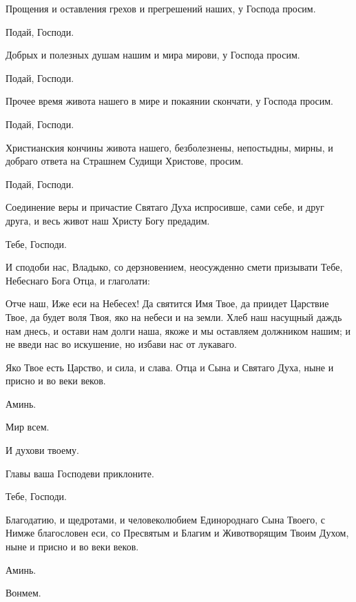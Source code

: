 \begin{mymulticols}
 Прощения и оставления грехов и прегрешений наших, у Господа просим. 

 Подай, Господи.

 Добрых и полезных душам нашим и мира мирови, у Господа просим. 

 Подай, Господи.

 Прочее время живота нашего в мире и покаянии скончати, у Господа просим. 

 Подай, Господи.

 Христианския кончины живота нашего, безболезнены, непостыдны, мирны, и добраго ответа на Страшнем Судищи Христове, просим. 

 Подай, Господи.

 Соединение веры и причастие Святаго Духа испросивше, сами себе, и друг друга, и весь живот наш Христу Богу предадим. 

 Тебе, Господи. 

 И сподоби нас, Владыко, со дерзновением, неосужденно смети призывати Тебе, Небеснаго Бога Отца, и глаголати: 


 Отче наш, Иже еси на Небесех! Да святится Имя Твое, да приидет Царствие Твое, да будет воля Твоя, яко на небеси и на земли. Хлеб наш насущный даждь нам днесь, и остави нам долги наша, якоже и мы оставляем должником нашим; и не введи нас во искушение, но избави нас от лукаваго. 

 Яко Твое есть Царство, и сила, и слава. Отца и Сына и Святаго Духа, ныне и присно и во веки веков. 

 Аминь. 

 Мир всем. 

 И духови твоему.

 Главы ваша Господеви приклоните.

 Тебе, Господи.

 Благодатию, и щедротами, и человеколюбием Единороднаго Сына Твоего, с Нимже благословен еси, со Пресвятым и Благим и Животворящим Твоим Духом, ныне и присно и во веки веков. 

 Аминь.


 Вонмем. 


\end{mymulticols}
